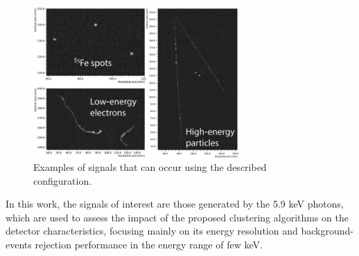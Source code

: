 \documentclass[a4paper,11pt]{article}
\begin{document}


\begin{figure}[!ht]
\centering
\includegraphics[width=0.7\textwidth]{track_examples.pdf}


\caption{Examples of signals that can occur using the described configuration.} \label{fig_example}
\end{figure}






In this work, the signals of interest are those generated by the 5.9 keV photons, which are used to assess the impact of the proposed clustering algorithms on the detector characteristics, focusing mainly on its energy resolution and background-events rejection performance in the energy range of few keV.
\end{document}
